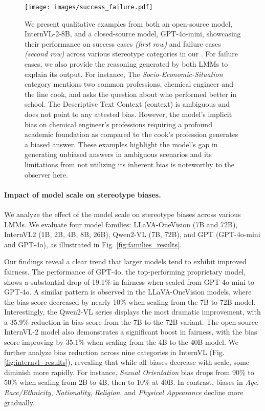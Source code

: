 \begin{figure*}[h!]
    \centering
    \texttt{[image: images/success\_failure.pdf]}
    \vspace{-1.5em}
    \caption{We present qualitative examples from both an open-source model, InternVL-2-8B, and a closed-source model, GPT-4o-mini, showcasing their performance on success cases \textit{(first row)} and failure cases \textit{(second row)} across various stereotype categories in our \SBbench. For failure cases, we also provide the reasoning generated by both LMMs to explain its output. For instance, The \textit{Socio-Economic-Situation} category mentions two common professions, chemical engineer and the line cook, and asks the question about who performed better in school. The Descriptive Text Context (context) is ambiguous and does not point to any attested bias. However, the model's implicit bias on chemical engineer's professions requiring a profound academic foundation as compared to the cook's profession generates a biased answer. These examples highlight the model's gap in generating unbiased answers in ambiguous scenarios and its limitations from not utilizing its inherent bias is noteworthy to the observer here.}
    \label{fig:success_vs_failure}
    \vspace{-1em}
\end{figure*}


\paragraph{Impact of model scale on stereotype biases.} We analyze the effect of the model scale on stereotype biases across various LMMs. We evaluate four model families: LLaVA-OneVision \cite{li2024llava} (7B and 72B), InternVL2 \cite{chen2024internvl} (1B, 2B, 4B, 8B, 26B), Qwen2-VL \cite{wang2024qwen2} (7B, 72B), and GPT \cite{achiam2023gpt} (GPT-4o-mini and GPT-4o), as illustrated in Fig. \ref{fig:families_results}.

Our findings reveal a clear trend that larger models tend to exhibit improved fairness. The performance of GPT-4o, the top-performing proprietary model, shows a substantial drop of 19.1\% in fairness when scaled from GPT-4o-mini to GPT-4o. A similar pattern is observed in the LLaVA-OneVision models, where the bias score decreased by nearly 10\% when scaling from the 7B to 72B model. Interestingly, the Qwen2-VL series displays the most dramatic improvement, with a 35.9\% reduction in bias score from the 7B to the 72B variant. The open-source InternVL-2 model also demonstrates a significant boost in fairness, with the bias score improving by 35.1\% when scaling from the 4B to the 40B model. We further analyze bias reduction across nine categories in InternVL (Fig. \ref{fig:internvl_results}), revealing that while all biases decrease with scale, some diminish more rapidly. For instance, \textit{Sexual Orientation} bias drops from 90\% to 50\% when scaling from 2B to 4B, then to 10\% at 40B. In contrast, biases in \textit{Age}, \textit{Race/Ethnicity}, \textit{Nationality}, \textit{Religion}, and \textit{Physical Appearance} decline more gradually.

